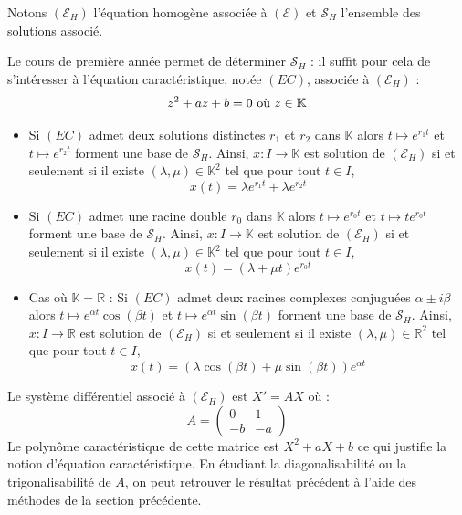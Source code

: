 \documentclass[a4paper,10pt]{report}
\begin{document}
\medskip

\noindent Notons $(\mathcal{E}_H)$ l'équation homogène associée à $(\mathcal{E})$ et $\mathcal{S}_H$ l'ensemble des solutions associé.

\medskip

\noindent Le cours de première année permet de déterminer $\mathcal{S}_H$ : il suffit pour cela de s'intéresser à l'équation caractéristique, notée $(EC)$, associée à $(\mathcal{E}_H)$ :
$$ z^2+az+b=0 \hbox{ où } z \in \mathbb{K}$$

\begin{prop} 
\begin{itemize}
\item Si $(EC)$ admet deux solutions distinctes $r_1$ et $r_2$ dans $\mathbb{K}$ alors $t \mapsto e^{r_1 t}$ et $t \mapsto e^{r_2 t}$ forment une base de $\mathcal{S}_H$. Ainsi, $x : I \rightarrow \mathbb{K}$ est solution de $(\mathcal{E}_H)$  si et seulement si il existe $(\lambda, \mu) \in \mathbb{K}^2$ tel que pour tout $t \in I$,
$$ x(t) = \lambda e^{r_1 t} + \lambda e^{r_2 t} $$
\item Si $(EC)$ admet une racine double $r_0$ dans $\mathbb{K}$ alors $t \mapsto e^{r_0 t}$ et $t \mapsto t e^{r_0 t}$ forment une base de $\mathcal{S}_H$. Ainsi, $x : I \rightarrow \mathbb{K}$ est solution de $(\mathcal{E}_H)$ si et seulement si il existe $(\lambda, \mu) \in \mathbb{K}^2$ tel que pour tout $t \in I$,
$$ x(t) =  (\lambda + \mu t)e^{r_0 t}  $$
\item Cas où $\mathbb{K}= \mathbb{R}$ : Si $(EC)$ admet deux racines complexes conjuguées $\alpha \pm i \beta$ alors $t \mapsto e^{\alpha t} \cos(\beta t)$ et $t \mapsto e^{\alpha t} \sin(\beta t)$ forment une base de $\mathcal{S}_H$. Ainsi, $x : I \rightarrow \mathbb{R}$ est solution de $(\mathcal{E}_H)$ si et seulement si il existe $(\lambda, \mu) \in \mathbb{R}^2$ tel que pour tout $t \in I$,
$$ x(t) = (\lambda \cos(\beta t) + \mu \sin( \beta t)) e^{\alpha t} $$
\end{itemize}
\end{prop}

\begin{rem} Le système différentiel associé à $(\mathcal{E}_H)$ est $X'=AX$ où :
$$ A = \begin{pmatrix}
0 & 1 \\
-b & -a
\end{pmatrix}$$
Le polynôme caractéristique de cette matrice est $X^2+aX+b$ ce qui justifie la notion d'équation caractéristique. En étudiant la diagonalisabilité ou la trigonalisabilité de $A$, on peut retrouver le résultat précédent à l'aide des méthodes de la section précédente.
\end{rem}
\end{document}

